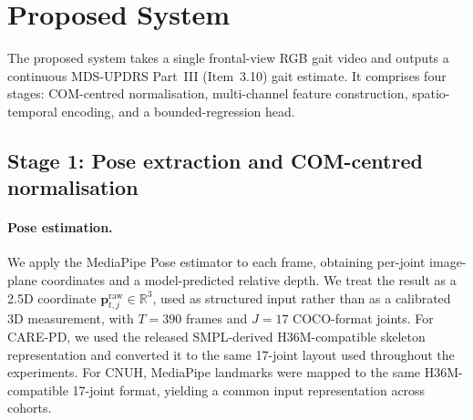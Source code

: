\documentclass[preprint,12pt]{elsarticle}
\begin{document}
\section{Proposed System}
\label{sec:method}

The proposed system takes a single frontal-view RGB gait video and outputs a
continuous MDS-UPDRS Part~III (Item~3.10) gait estimate. It comprises four
stages: COM-centred normalisation, multi-channel feature construction,
spatio-temporal encoding, and a bounded-regression head.

\subsection{Stage 1: Pose extraction and COM-centred normalisation}
\label{sec:stage1}

\paragraph{Pose estimation.}
We apply the MediaPipe Pose estimator \cite{bazarevsky2020blazepose} to each
frame, obtaining per-joint image-plane coordinates and a model-predicted
relative depth. We treat the result as a 2.5D coordinate
$\mathbf{p}^{\text{raw}}_{t,j}\in\mathbb{R}^{3}$, used as structured input
rather than as a calibrated 3D measurement, with $T=390$ frames and $J=17$
COCO-format joints.
For CARE-PD, we used the released SMPL-derived H36M-compatible skeleton
representation and converted it to the same 17-joint layout used throughout the
experiments. For CNUH, MediaPipe landmarks were mapped to the same
H36M-compatible 17-joint format, yielding a common input representation across
cohorts.
\end{document}
